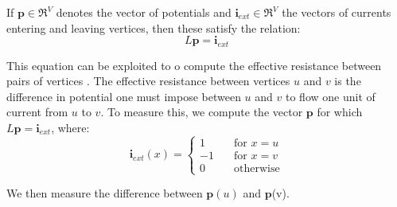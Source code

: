 If $\textbf{p} \in \Re^{V}$ denotes the vector of potentials and
$\textbf{i}_{ext} \in \Re^{V}$ the vectors of currents entering and leaving
vertices, then these satisfy the relation:
\begin{equation}
L\textbf{p} = \textbf{i}_{ext}
\end{equation}

This equation can be exploited to o compute the effective resistance between
pairs of vertices \cite{Spielman:2010}. The effective resistance between
vertices $u$ and $v$ is the difference in potential one must impose between $u$
and $v$ to flow one unit of current from $u$ to $v$. To measure this, we compute
the vector $\textbf{p}$ for which $L\textbf{p} = \textbf{i}_{ext}$, where:
\begin{equation}
\textbf{i}_{ext}(x) =
    \left\{
        \begin{array}{ll}
            1 &     \quad \text{for $x=u$}\\
            -1 &    \quad \text{for $x=v$}\\
            0 &     \quad \text{otherwise}
        \end{array}
    \right.
\end{equation}

We then measure the difference between $\textbf{p}(u)$ and $\textbf{p}$(v).
